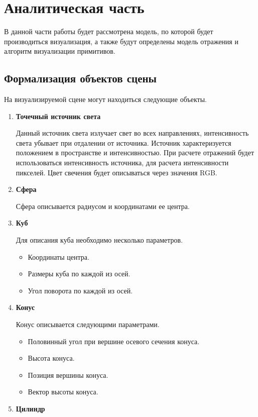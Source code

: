 
\chapter{Аналитическая часть}
В данной части работы будет рассмотрена модель, по которой будет производиться
визуализация, а также будут определены модель отражения и алгоритм визуализации примитивов.
\section{Формализация объектов сцены}
\label{sec:obj_formalasation}
На визуализируемой сцене могут находиться следующие объекты.
	\begin{enumerate}
	\item  \textbf{Точечный источник света}
	
	Данный источник света излучает свет во всех направлениях, интенсивность света убывает при отдалении от источника.
	Источник характеризуется положением в пространстве и интенсивностью.
	При расчете отражений будет использоваться интенсивность источника, для расчета интенсивности пикселей. Цвет свечения будет описываться через значения RGB.
	

	
	\item \textbf{Сфера}
	
	Сфера описывается радиусом и координатами ее центра.

	\item  \textbf{Куб}
	
	Для описания куба необходимо несколько параметров.
	\begin{itemize}
		\item Координаты центра.
		\item Размеры куба по каждой из осей.
		\item Угол поворота по каждой из осей.
	\end{itemize}
	\item  \textbf{Конус}
	
	Конус описывается следующими параметрами.
	\begin{itemize}
		\item Половинный угол при вершине осевого сечения конуса.
		\item Высота конуса.
		\item Позиция вершины конуса.
		\item Вектор высоты конуса.
	\end{itemize}

	\item  \textbf{Цилиндр}
	

\end{enumerate}
